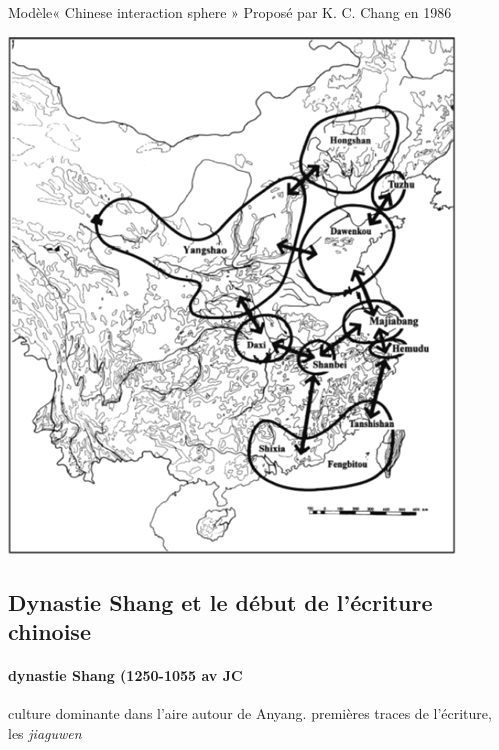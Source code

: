 \begin{marginfigure}
        \centering
        \caption{Modèle« Chinese interaction sphere » Proposé par K. C. Chang en 1986}
\includegraphics[width=\textwidth]{ConfucianismeTaoismeBouddhismeChinois/Images/ModeleChineseInteractionSphere.png}
\end{marginfigure} 


\FloatBarrier
\subsection{Dynastie Shang et le début de l'écriture chinoise}

\paragraph{dynastie Shang (1250-1055 av JC} culture dominante dans l'aire autour de Anyang. premières traces de l'écriture, les \textit{jiaguwen}

